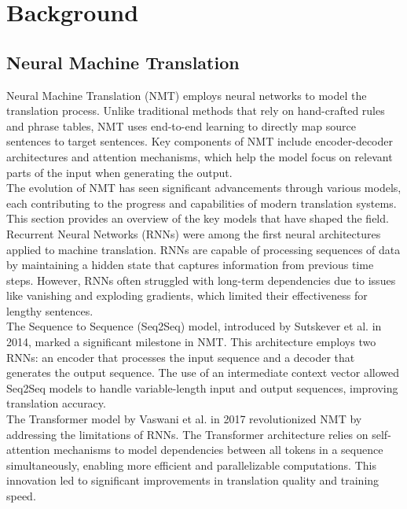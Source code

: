 \documentclass[PhD]{PHlab-thesis}
\begin{document}
\section{Background} 

\subsection{Neural Machine Translation}
Neural Machine Translation (NMT) employs neural networks to model the translation process. Unlike traditional methods that rely on hand-crafted rules and phrase tables, NMT uses end-to-end learning to directly map source sentences to target sentences.\cite{sutskever2014sequence} Key components of NMT include encoder-decoder architectures and attention mechanisms,\cite{vaswani2017attention} which help the model focus on relevant parts of the input when generating the output.\\
	The evolution of NMT has seen significant advancements through various models, each contributing to the progress and capabilities of modern translation systems. This section provides an overview of the key models that have shaped the field.\\
Recurrent Neural Networks (RNNs) were among the first neural architectures applied to machine translation. RNNs are capable of processing sequences of data by maintaining a hidden state that captures information from previous time steps. However, RNNs often struggled with long-term dependencies due to issues like vanishing and exploding gradients, which limited their effectiveness for lengthy sentences.\\
	The Sequence to Sequence (Seq2Seq) model\cite{sutskever2014sequence}, introduced by Sutskever et al. in 2014, marked a significant milestone in NMT. This architecture employs two RNNs: an encoder that processes the input sequence and a decoder that generates the output sequence. The use of an intermediate context vector allowed Seq2Seq models to handle variable-length input and output sequences, improving translation accuracy.\\
The Transformer model by Vaswani et al\cite{vaswani2017attention}. in 2017 revolutionized NMT by addressing the limitations of RNNs. The Transformer architecture relies on self-attention mechanisms to model dependencies between all tokens in a sequence simultaneously, enabling more efficient and parallelizable computations. This innovation led to significant improvements in translation quality and training speed.\\
\end{document}
